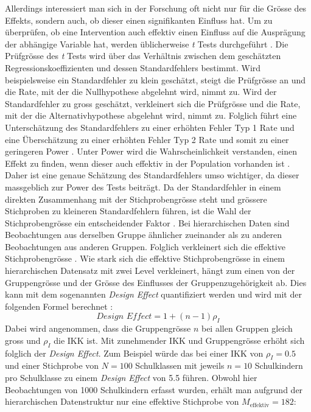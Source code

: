 \documentclass[12pt]{article}\usepackage[]{graphicx}\usepackage[]{color}
\begin{document}
Allerdings interessiert man sich in der Forschung oft nicht nur für die Grösse des Effekts, sondern auch, ob dieser einen signifikanten Einfluss hat. Um zu überprüfen, ob eine Intervention auch effektiv einen Einfluss auf die Ausprägung der abhängige Variable hat, werden üblicherweise \textit{t} Tests durchgeführt \citep{SnijdersTomA.B2012Ma:a}. Die Prüfgrösse des \textit{t} Tests wird über das Verhältnis zwischen dem geschätzten Regressionskoeffizienten und dessen Standardfehlers bestimmt. Wird beispielsweise ein Standardfehler zu klein geschätzt, steigt die Prüfgrösse an und die Rate, mit der die Nullhypothese abgelehnt wird, nimmt zu. Wird der Standardfehler zu gross geschätzt, verkleinert sich die Prüfgrösse und die Rate, mit der die Alternativhypothese abgelehnt wird, nimmt zu. Folglich führt eine Unterschätzung des Standardfehlers zu einer erhöhten Fehler Typ 1 Rate und eine Überschätzung zu einer erhöhten Fehler Typ 2 Rate und somit zu einer geringeren Power \citep{SnijdersTomA.B2012Ma:a}. Unter Power wird die Wahrscheinlichkeit verstanden, einen Effekt zu finden, wenn dieser auch effektiv in der Population vorhanden ist \citep{scherbaumferreter2009powersample}. Daher ist eine genaue Schätzung des Standardfehlers umso wichtiger, da dieser massgeblich zur Power des Tests beiträgt. Da der Standardfehler in einem direkten Zusammenhang mit der Stichprobengrösse steht und grössere Stichproben zu kleineren Standardfehlern führen, ist die Wahl der Stichprobengrösse ein entscheidender Faktor \citep{james2013introduction, SnijdersTomA.B2012Ma:a}. Bei hierarchischen Daten sind Beobachtungen aus derselben Gruppe ähnlicher zueinander als zu anderen Beobachtungen aus anderen Gruppen. Folglich verkleinert sich die effektive Stichprobengrösse \citep{raudenbush2002hierarchical}. Wie stark sich die effektive Stichprobengrösse in einem hierarchischen Datensatz mit zwei Level verkleinert, hängt zum einen von der Gruppengrösse und der Grösse des Einflusses der Gruppenzugehörigkeit ab. Dies kann mit dem sogenannten \textit{Design Effect} quantifiziert werden und wird mit der folgenden Formel berechnet \citep{raudenbush2002hierarchical,SnijdersTomA.B2012Ma:a}:
\begin{equation}
\textit{Design Effect} = 1 + (n - 1) \rho_I
\end{equation}
Dabei wird angenommen, dass die Gruppengrösse $n$ bei allen Gruppen gleich gross und $\rho_I$ die IKK ist. Mit zunehmender IKK und Gruppengrösse erhöht sich folglich der \textit{Design Effect}. Zum Beispiel würde das bei einer IKK von $\rho_I = 0.5$ und einer Stichprobe von $N = 100$ Schulklassen mit jeweils $n = 10$ Schulkindern pro Schulklasse zu einem \textit{Design Effect} von 5.5 führen. Obwohl hier Beobachtungen von 1000 Schulkindern erfasst wurden, erhält man aufgrund der hierarchischen Datenstruktur nur eine effektive Stichprobe von $M_{\text{effektiv}} = 182$:
\end{document}
